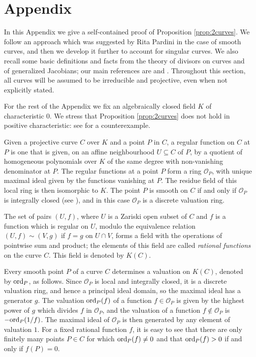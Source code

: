 \documentclass{amsart}
\theoremstyle{plain}
\theoremstyle{definition}
\newcommand{\ord}{\textnormal{ord}}
\begin{document}
\section{Appendix}\label{sec:appendix}

In this Appendix we give a self-contained proof of Proposition \ref{prop:2curves}. We follow an approach which was suggested by Rita Pardini in the case of smooth curves, and then we develop it further to account for singular curves. We also recall some basic definitions and facts from the theory of divisors on curves and of generalized Jacobians; our main references are \cite{HS} and \cite{Serre}. Throughout this section, all curves will be assumed to be irreducible and projective, even when not explicitly stated.

For the rest of the Appendix we fix an algebraically closed field $K$ of characteristic $0$. We stress that Proposition \ref{prop:2curves} does not hold in positive characteristic: see \cite[Corollario 1.6]{Mar} for a counterexample. 

Given a projective curve $C$ over $K$ and a point $P$ in $C$, a regular function on $C$ at $P$ is one that is given, on an affine neighbourhood $U \subseteq C$ of $P$, by a quotient of homogeneous polynomials over $K$ of the same degree with non-vanishing denominator at $P$. The regular functions at a point $P$ form a ring $\mathcal{O}_P$, with unique maximal ideal given by the functions vanishing at $P$. The residue field of this local ring is then isomorphic to $K$. The point $P$ is smooth on $C$ if and only if $\mathcal{O}_P$ is integrally closed (see \cite[Exercise A.1.1.5]{HS}), and in this case $\mathcal{O}_P$ is a discrete valuation ring.

The set of pairs $(U,f)$, where $U$ is a Zariski open subset of $C$ and $f$ is a function which is regular on $U$, modulo the equivalence relation $(U,f) \sim (V,g)$ if $f=g$ on $U \cap V$, forms a field with the operations of pointwise sum and product; the elements of this field are called \emph{rational functions} on the curve $C$. This field is denoted by $K(C)$.

Every smooth point $P$ of a curve $C$ determines a valuation on $K(C)$, denoted by $\ord_P$, as follows. Since $\mathcal{O}_P$ is local and integrally closed, it is a discrete valuation ring, and hence a principal ideal domain, so the maximal ideal has a generator $g$. The valuation $\ord_P(f)$ of a function $f \in \mathcal{O}_P$ is given by the highest power of $g$ which divides $f$ in $\mathcal{O}_P$, and the valuation of a function  $f \notin \mathcal{O}_P$ is $-\ord_P(1/f)$. The maximal ideal of $\mathcal{O}_P$ is then generated by any element of valuation $1$. For a fixed rational function $f$, it is easy to see that there are only finitely many points $P \in C$ for which $\ord_P(f) \neq 0$ and that $\ord_P(f) > 0$ if and only if $f(P) = 0$. 
\end{document}
